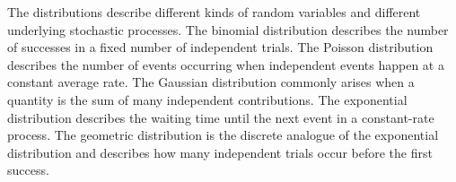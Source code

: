 \begin{table}[h!]
\caption{Common probability distributions and representative examples.
The geometric distribution is defined here as the number of failures before the first success.}
\label{tab: prob_distributions}
\end{table}




The distributions describe different kinds of random variables and different underlying stochastic processes.
The binomial distribution describes the number of successes in a fixed number of independent trials.
The Poisson distribution describes the number of events occurring when independent events happen at a constant average rate.
The Gaussian distribution commonly arises when a quantity is the sum of many independent contributions.
The exponential distribution describes the waiting time until the next event in a constant-rate process.
The geometric distribution is the discrete analogue of the exponential distribution and describes how many independent trials occur before the first success.


